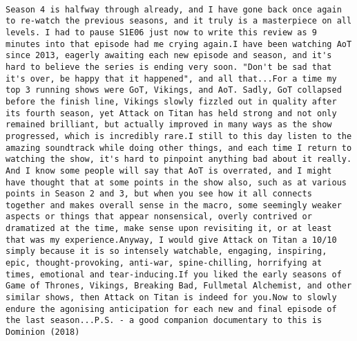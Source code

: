 \documentclass[
]{article}
\begin{document}
\begin{verbatim}
                                                                                                                                                                                                                                                                                                                                                                                                                                                                                                                                                                                                                                                                                                                                                                                                                                                                                                                                                                                                                                                                                                                                                                                                                                                                   Season 4 is halfway through already, and I have gone back once again to re-watch the previous seasons, and it truly is a masterpiece on all levels. I had to pause S1E06 just now to write this review as 9 minutes into that episode had me crying again.I have been watching AoT since 2013, eagerly awaiting each new episode and season, and it's hard to believe the series is ending very soon. "Don't be sad that it's over, be happy that it happened", and all that...For a time my top 3 running shows were GoT, Vikings, and AoT. Sadly, GoT collapsed before the finish line, Vikings slowly fizzled out in quality after its fourth season, yet Attack on Titan has held strong and not only remained brilliant, but actually improved in many ways as the show progressed, which is incredibly rare.I still to this day listen to the amazing soundtrack while doing other things, and each time I return to watching the show, it's hard to pinpoint anything bad about it really. And I know some people will say that AoT is overrated, and I might have thought that at some points in the show also, such as at various points in Season 2 and 3, but when you see how it all connects together and makes overall sense in the macro, some seemingly weaker aspects or things that appear nonsensical, overly contrived or dramatized at the time, make sense upon revisiting it, or at least that was my experience.Anyway, I would give Attack on Titan a 10/10 simply because it is so intensely watchable, engaging, inspiring, epic, thought-provoking, anti-war, spine-chilling, horrifying at times, emotional and tear-inducing.If you liked the early seasons of Game of Thrones, Vikings, Breaking Bad, Fullmetal Alchemist, and other similar shows, then Attack on Titan is indeed for you.Now to slowly endure the agonising anticipation for each new and final episode of the last season...P.S. - a good companion documentary to this is Dominion (2018)

\end{verbatim}
\end{document}
